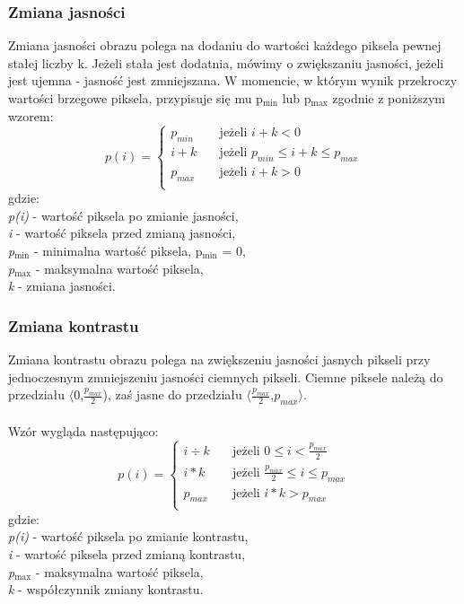 \documentclass{classrep}
\begin{document}
\subsubsection{Zmiana jasności}
Zmiana jasności obrazu polega na dodaniu do wartości każdego piksela pewnej stałej liczby k. Jeżeli stała jest dodatnia, mówimy o zwiększaniu jasności, jeżeli jest ujemna - jasność jest zmniejszana. W momencie, w którym wynik przekroczy wartości brzegowe piksela, przypisuje się mu p$_{\text{min}}$ lub p$_{\text{max}}$ zgodnie z poniższym wzorem:
\[ p(i) =
  \begin{cases}
    p_{min} & \quad \text{jeżeli } i + k < 0\\
    i + k  & \quad \text{jeżeli } p_{min} \leq i+k \leq p_{max}\\
    p_{max}  & \quad \text{jeżeli } i + k > 0\\
  \end{cases}
\]
gdzie:\\
\textit{p(i)} - wartość piksela po zmianie jasności,\\
\textit{i} - wartość piksela przed zmianą jasności,\\
\textit{p$_{\text{min}}$} - minimalna wartość piksela, p$_{\text{min}}$ = 0,\\
\textit{p$_{\text{max}}$} - maksymalna wartość piksela,\\
\textit{k} - zmiana jasności.\\

\subsubsection{Zmiana kontrastu}
Zmiana kontrastu obrazu polega na zwiększeniu jasności jasnych pikseli przy jednoczesnym zmniejszeniu jasności ciemnych pikseli. Ciemne piksele należą do przedziału $\langle$0,$ \frac{p_{max}}{2}$), zaś jasne do przedziału $\langle$$ \frac{p_{max}}{2}$,$p_{max}$$\rangle$.\\
\\
Wzór wygląda następująco:
\[ p(i) =
  \begin{cases}
    i \div k  & \quad \text{jeżeli } 0 \leq i < \frac{p_{max}}{2}\\
    i \ast k  & \quad \text{jeżeli } \frac{p_{max}}{2} \leq i \leq p_{max}\\
    p_{max}  & \quad \text{jeżeli } i \ast k > p_{max}\\
  \end{cases}
\]
gdzie:\\
\textit{p(i)} - wartość piksela po zmianie kontrastu,\\
\textit{i} - wartość piksela przed zmianą kontrastu,\\
\textit{p$_{\text{max}}$} - maksymalna wartość piksela,\\
\textit{k} - współczynnik zmiany kontrastu.\\
\end{document}

